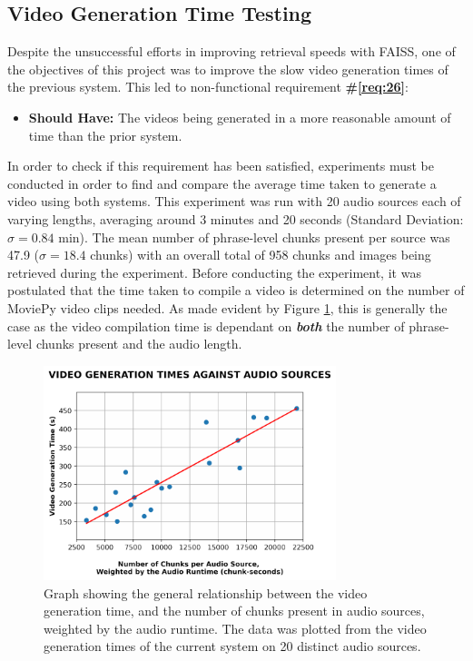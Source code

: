 \documentclass{l4proj}
\begin{document}
\subsection{Video Generation Time Testing}
\label{sec:video_generation_time}
Despite the unsuccessful efforts in improving retrieval speeds with FAISS, one of the objectives of this project was to improve the slow video generation times of the previous system. This led to non-functional requirement \textbf{\#\ref{req:26}}:

\begin{itemize}
    \item \textbf{Should Have:} The videos being generated in a more reasonable amount of time than the prior system.
\end{itemize}

In order to check if this requirement has been satisfied, experiments must be conducted in order to find and compare the average time taken to generate a video using both systems. This experiment was run with 20 audio sources each of varying lengths, averaging around 3 minutes and 20 seconds (Standard Deviation: $\sigma = 0.84$ min). The mean number of phrase-level chunks present per source was 47.9 ($\sigma = 18.4$ chunks) with an overall total of 958 chunks and images being retrieved during the experiment. Before conducting the experiment, it was postulated that the time taken to compile a video is determined on the number of MoviePy video clips needed. As made evident by Figure \ref{fig:videography_against_wchunks}, this is generally the case as the video compilation time is dependant on \textbf{\emph{both}} the number of phrase-level chunks present and the audio length.

\begin{figure}[H]
    \centering
    \includegraphics[width=0.76\textwidth]{figures/video_generation_against_wchunks.pdf}
    \caption{Graph showing the general relationship between the video generation time, and the number of chunks present in audio sources, weighted by the audio runtime. The data was plotted from the video generation times of the current system on 20 distinct audio sources.}
    \label{fig:videography_against_wchunks}
\end{figure}
\end{document}
